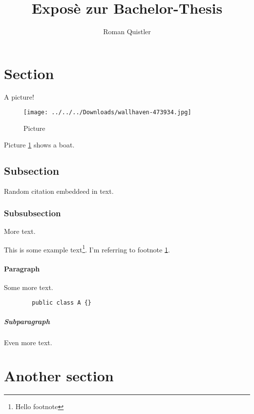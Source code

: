 \documentclass[11pt]{scrartcl}
\title{Exposè zur Bachelor-Thesis}
\author{Roman Quistler}
\begin{document}
	
	\maketitle
	\newpage
	\tableofcontents
	\newpage
	
	
	\section{Section}
	\label{sec:einleitende-worte}
	
	A picture!

	\begin{figure}[h!]
		\texttt{[image: ../../../Downloads/wallhaven-473934.jpg]}
		\caption{Picture}
		\label{pic:pic1}
	\end{figure}
	
	Picture \ref{pic:pic1} shows a boat.

	\subsection{Subsection}
	
	Random citation \autocite[1]{DUMMY:1} embeddeed in text.
	
	\subsubsection{Subsubsection}
	
	More text.
	
	This is some example text\footnote{\label{myfootnote}Hello footnote}.
	I'm referring to footnote \ref{myfootnote}.
	
	\paragraph{Paragraph}
	
	Some more text.
	
	\begin{lstlisting}
		public class A {}
	\end{lstlisting}
	
	\subparagraph{Subparagraph}
	
	Even more text.
	
	\section{Another section}
	
	\newpage
	
	\begin{appendix}
		\listoffigures
	\end{appendix}
	
	\printbibliography
	
\end{document}

